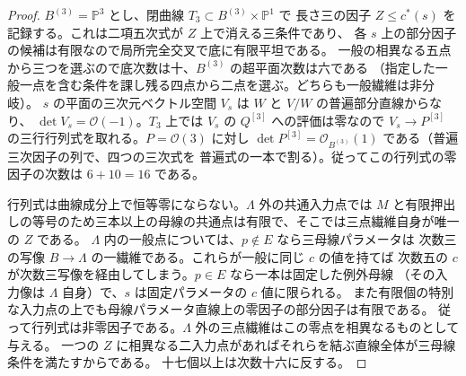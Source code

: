 \begin{proof}
$B^{(3)}=\mathbb P^3$ とし、閉曲線 $T_3\subset B^{(3)}\times\mathbb P^1$ で
長さ三の因子 $Z\le c^*(s)$ を記録する。これは二項五次式が $Z$ 上で消える三条件であり、
各 $s$ 上の部分因子の候補は有限なので局所完全交叉で底に有限平坦である。
一般の相異なる五点から三つを選ぶので底次数は十、$B^{(3)}$ の超平面次数は六である
（指定した一般一点を含む条件を課し残る四点から二点を選ぶ。どちらも一般繊維は非分岐）。
$s$ の平面の三次元ベクトル空間 $V_s$ は $W$ と $V/W$ の普遍部分直線からなり、
$\det V_s=\mathcal O(-1)$。$T_3$ 上では $V_s$ の $Q^{[3]}$ への評価は零なので
$V_s\to P^{[3]}$ の三行行列式を取れる。$P=\mathcal O(3)$ に対し
$\det P^{[3]}=\mathcal O_{B^{(3)}}(1)$ である（普遍三次因子の列で、四つの三次式を
普遍式の一本で割る）。従ってこの行列式の零因子の次数は $6+10=16$ である。

行列式は曲線成分上で恒等零にならない。$\Lambda$ 外の共通入力点では
$M$ と有限押出しの等号のため三本以上の母線の共通点は有限で、そこでは三点繊維自身が唯一の $Z$ である。
$\Lambda$ 内の一般点については、$p\notin E$ なら三母線パラメータは
次数三の写像 $B\to\Lambda$ の一繊維である。これらが一般に同じ $c$ の値を持てば
次数五の $c$ が次数三写像を経由してしまう。$p\in E$ なら一本は固定した例外母線
（その入力像は $\Lambda$ 自身）で、$s$ は固定パラメータの $c$ 値に限られる。
また有限個の特別な入力点の上でも母線パラメータ直線上の零因子の部分因子は有限である。
従って行列式は非零因子である。$\Lambda$ 外の三点繊維はこの零点を相異なるものとして与える。
一つの $Z$ に相異なる二入力点があればそれらを結ぶ直線全体が三母線条件を満たすからである。
十七個以上は次数十六に反する。
\end{proof}

